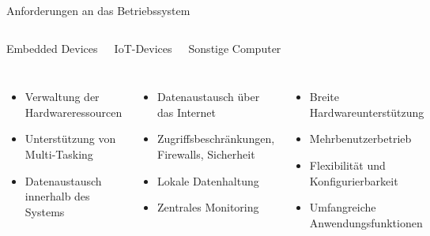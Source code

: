 {
\small
\setlength{\leftmargini}{1.2em}

\begin{frame}{Anforderungen an das Betriebssystem}
    \begin{columns}[T]
        \begin{block}{Embedded Devices}
        \end{block}

        \begin{block}{IoT-Devices}
        \end{block}

        \begin{block}{Sonstige Computer}
        \end{block}
    \end{columns}

    \begin{columns}[T]
        \begin{itemize}
            \item Verwaltung der Hardwareressourcen
            \item Unterstützung von Multi-Tasking
            \item Datenaustausch innerhalb des Systems
        \end{itemize}

        \begin{itemize}
            \item Datenaustausch über das Internet
            \item Zugriffsbeschränkungen, Firewalls, Sicherheit
            \item Lokale Datenhaltung
            \item Zentrales Monitoring
        \end{itemize}

        \begin{itemize}
            \item Breite Hardwareunterstützung
            \item Mehrbenutzerbetrieb
            \item Flexibilität und Konfigurierbarkeit
            \item Umfangreiche Anwendungsfunktionen
        \end{itemize}
    \end{columns}


\end{frame}}
